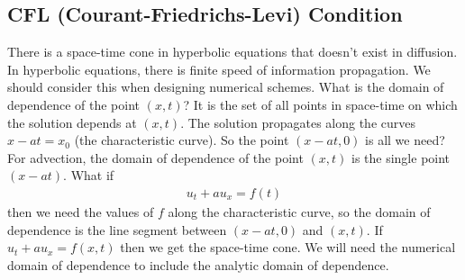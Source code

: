\documentclass{article}
\begin{document}
        \subsection{CFL (Courant-Friedrichs-Levi) Condition}
            There is a space-time cone in hyperbolic equations that doesn't exist in diffusion.  In hyperbolic equations, there is finite speed of information propagation.  We should consider this when designing numerical schemes.  What is the domain of dependence of the point $(x,t)$?  It is the set of all points in space-time on which the solution depends at $(x,t)$.  The solution propagates along the curves $x - at = x_0$ (the characteristic curve).  So the point $(x - at,0)$ is all we need?  For advection, the domain of dependence of the point $(x,t)$ is the single point $(x-at)$.  What if
            \begin{align*}
                u_t + au_x = f(t)
            \end{align*}
            then we need the values of $f$ along the characteristic curve, so the domain of dependence is the line segment between $(x-at,0)$ and $(x,t)$.  If $u_t + au_x = f(x,t)$ then we get the space-time cone.  We will need the numerical domain of dependence to include the analytic domain of dependence.
\end{document}
